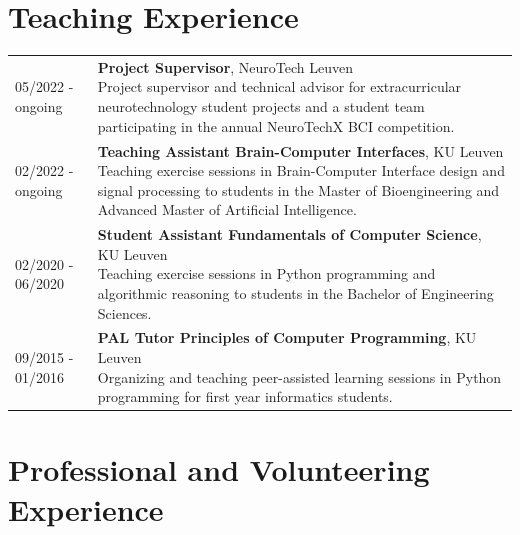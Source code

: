 \documentclass[10pt,a4paper]{article}
\begin{document}
\section*{Teaching Experience}

\begin{tabularx}{\linewidth}{@{}p{1.2in} X@{}}
	05/2022 - ongoing & \makecell[{{X}}t]{\textbf{Project Supervisor}, NeuroTech Leuven                          \\
		Project supervisor and technical advisor for extracurricular
	neurotechnology student projects and a student team participating in the annual NeuroTechX BCI competition.} \\

	02/2022 - ongoing & \makecell[{{X}}t]{\textbf{Teaching Assistant Brain-Computer Interfaces}, KU Leuven       \\
		Teaching exercise sessions in Brain-Computer Interface design and
		signal processing to students in the Master of Bioengineering and
	Advanced Master of Artificial Intelligence.}                                                                 \\
	02/2020 - 06/2020 & \makecell[{{X}}t]{\textbf{Student Assistant Fundamentals of Computer Science}, KU Leuven \\
		Teaching exercise sessions in Python programming and
		algorithmic reasoning to students in the Bachelor of
	Engineering Sciences.}                                                                                       \\
	09/2015 - 01/2016 & \makecell[{{X}}t]{\textbf{PAL Tutor Principles of Computer Programming}, KU Leuven       \\
		Organizing and teaching peer-assisted learning sessions in Python programming for first year informatics
	students.}                                                                                                   \\
\end{tabularx}

\section*{Professional and Volunteering Experience}
\end{document}
